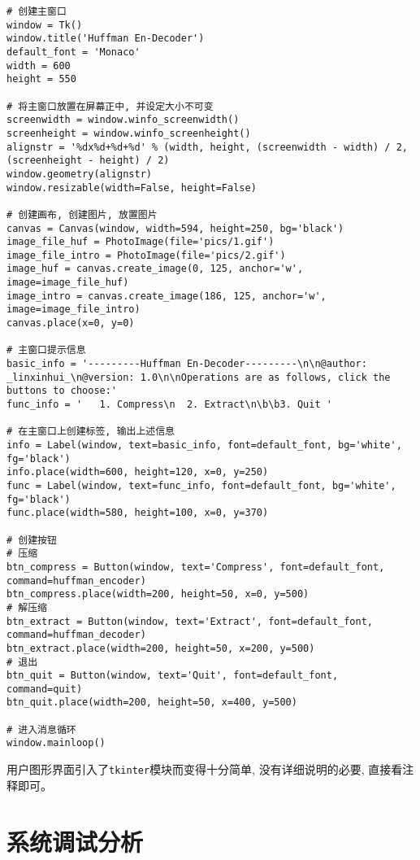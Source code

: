 \documentclass[a4paper]{ctexart}
\begin{document}
{\setmainfont{Courier New Bold}              
\begin{lstlisting}
# 创建主窗口
window = Tk()
window.title('Huffman En-Decoder')
default_font = 'Monaco'
width = 600
height = 550

# 将主窗口放置在屏幕正中, 并设定大小不可变
screenwidth = window.winfo_screenwidth()
screenheight = window.winfo_screenheight()
alignstr = '%dx%d+%d+%d' % (width, height, (screenwidth - width) / 2, (screenheight - height) / 2)
window.geometry(alignstr)
window.resizable(width=False, height=False)

# 创建画布, 创建图片, 放置图片
canvas = Canvas(window, width=594, height=250, bg='black')
image_file_huf = PhotoImage(file='pics/1.gif')
image_file_intro = PhotoImage(file='pics/2.gif')
image_huf = canvas.create_image(0, 125, anchor='w', image=image_file_huf)
image_intro = canvas.create_image(186, 125, anchor='w', image=image_file_intro)
canvas.place(x=0, y=0)

# 主窗口提示信息
basic_info = '---------Huffman En-Decoder---------\n\n@author: _linxinhui_\n@version: 1.0\n\nOperations are as follows, click the buttons to choose:'
func_info = '   1. Compress\n  2. Extract\n\b\b3. Quit '

# 在主窗口上创建标签, 输出上述信息
info = Label(window, text=basic_info, font=default_font, bg='white', fg='black')
info.place(width=600, height=120, x=0, y=250)
func = Label(window, text=func_info, font=default_font, bg='white', fg='black')
func.place(width=580, height=100, x=0, y=370)

# 创建按钮
# 压缩
btn_compress = Button(window, text='Compress', font=default_font, command=huffman_encoder)
btn_compress.place(width=200, height=50, x=0, y=500)
# 解压缩
btn_extract = Button(window, text='Extract', font=default_font, command=huffman_decoder)
btn_extract.place(width=200, height=50, x=200, y=500)
# 退出
btn_quit = Button(window, text='Quit', font=default_font, command=quit)
btn_quit.place(width=200, height=50, x=400, y=500)

# 进入消息循环
window.mainloop()
\end{lstlisting}}

用户图形界面引入了\texttt{tkinter}模块而变得十分简单, 没有详细说明的必要, 直接看注释即可。


\section{系统调试分析}\label{header-n412}
\end{document}
